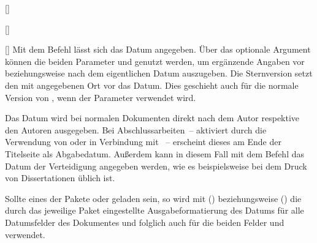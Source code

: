 \begin{Declaration*}{}
\begin{Declaration*}{}
\begin{Declaration*}{}
\begin{Declaration}{[]}
\begin{Declaration}[v2.05]{%
  []%
}
\begin{Declaration}[v2.05]{%
}
\begin{Declaration}[v2.05]{%
}
\begin{Declaration}[v2.05]{%
}
\begin{Declaration}{[]}
\printdeclarationlist%
%
%
%
%
Mit dem Befehl  lässt sich das Datum angegeben. 
Über das optionale Argument können die beiden Parameter 
 und  genutzt werden, um 
ergänzende Angaben vor beziehungsweise nach dem eigentlichen Datum auszugeben. 
Die Sternversion  setzt den mit  angegebenen Ort vor 
das Datum. Dies geschieht auch für die normale Version von , wenn 
der Parameter  verwendet wird.

Das Datum wird bei normalen Dokumenten direkt nach dem Autor respektive den 
Autoren ausgegeben. Bei Abschlussarbeiten~-- aktiviert durch die Verwendung von 
 oder  in Verbindung mit ~-- 
erscheint dieses am Ende der Titelseite als Abgabedatum. Außerdem kann in 
diesem Fall mit dem Befehl das Datum der Verteidigung 
angegeben werden, wie es beispielsweise bei dem Druck von Dissertationen üblich 
ist.

Sollte eines der Pakete  oder  geladen 
sein, so wird mit () beziehungsweise 
() die durch das jeweilige Paket eingestellte 
Ausgabeformatierung des Datums für alle Datumsfelder des Dokumentes und 
folglich auch für die beiden Felder  und  
verwendet.
\end{Declaration}
\end{Declaration}
\end{Declaration}
\end{Declaration}
\end{Declaration}
\end{Declaration}


\end{Declaration*}
\end{Declaration*}
\end{Declaration*}
